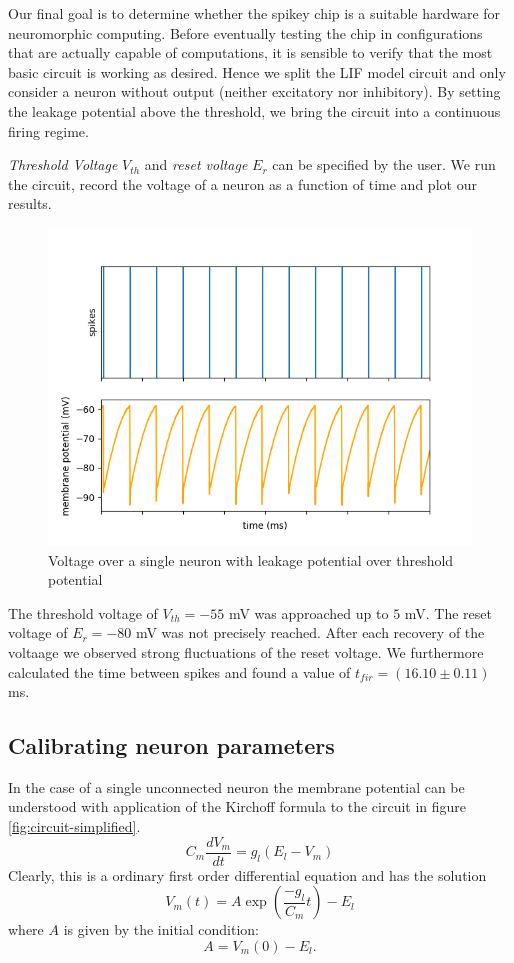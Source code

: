 \documentclass[a4paper,twocolumn]{article}
\begin{document}
Our final goal is to determine whether the spikey chip is a suitable hardware for neuromorphic computing.  Before eventually testing the chip in configurations that are actually capable of computations,  it is sensible to verify that the most basic circuit is working as desired.  Hence we split the LIF model circuit and only consider a neuron without output (neither excitatory nor inhibitory).  By setting the leakage potential above the threshold, we bring the circuit into a continuous firing regime. \par
\textit{Threshold Voltage} $V_{th}$ and \textit{reset voltage} $E_r$ can be specified by the user.  We run the circuit,  record the voltage of a neuron as a function of time and plot our results.

\begin{figure}[ht]
    \centering
    \includegraphics[width=.5\textwidth]{figures/fp_task1_1membrane.png}
    \caption{Voltage over a single neuron with leakage potential over threshold potential}
    \label{fig:feed-forward}
\end{figure}

The threshold voltage of $V_{th} = -55$ mV was approached up to $5$ mV.  The reset voltage of $E_r = -80$ mV was not precisely reached.  After each recovery of the voltaage we observed strong fluctuations of the reset voltage.  We furthermore calculated the time between spikes and found a value of $t_{fir} = (16.10\pm 0.11)$ ms.
\subsection{Calibrating neuron parameters}

In the case of a single unconnected neuron the membrane potential can be
understood with application of the Kirchoff formula to the circuit in figure
\ref{fig:circuit-simplified}.
\[
    C_m \frac{dV_m}{dt} = g_l(E_l - V_m)
\]
Clearly, this is a ordinary first order differential equation and has the
solution
\begin{equation}
    V_m(t) = A \exp(\frac{-g_l}{C_m}t) - E_l
    \label{eq:diff-eq-sol}
\end{equation}
where $A$ is given by the initial condition:
\[
    A = V_m(0) - E_l.
\]
\end{document}
